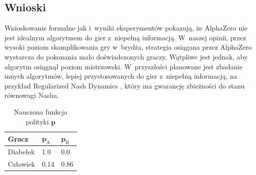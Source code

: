 \subsection*{Wnioski}

Wnioskowanie formalne jak i~wyniki eksperymentów pokazują,
że AlphaZero nie jest idealnym algorytmem do gier z~niepełną informacją.
W~naszej opinii, przez wysoki poziom skomplikowania gry w~brydża,
strategia osiągana przez AlphaZero wystarcza do pokonania mało doświadczonych graczy.
Wątpliwe jest jednak, aby algorytm osiągnął poziom mistrzowski.
W~przyszłości planowane jest zbadanie innych algorytmów,
lepiej przystosowanych do gier z~niepełną informacją,
na przykład Regularized Nash Dynamics \cite{doi:10.1126/science.add4679},
który ma gwarancję zbieżności do stanu równowagi Nasha.


\begin{table}[h!]
    \centering
    \caption{Nauczona funkcja polityki $\mathbf{p}$}
    \label{tab:devil-game-policy}
    \begin{tabular}{lll}
        \toprule
        Gracz & $\mathbf{p}_\mathrm{A}$ & $\mathbf{p}_\mathrm{B}$ \\ \midrule
        Diabełek & 1.0 & 0.0 \\
        Człowiek & 0.14 & 0.86 \\
        \bottomrule
    \end{tabular}
\end{table}



